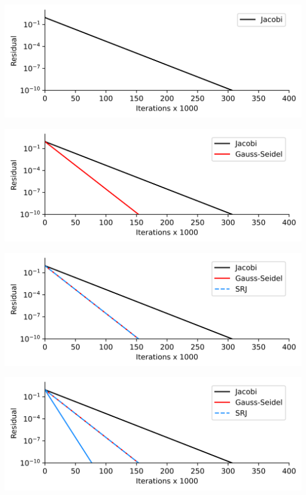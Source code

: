 \documentclass[aspectratio=169]{beamer}
\begin{document}
{
  \begin{frame}
    \begin{overprint}
      \includegraphics[width=\textwidth]{comparaisons_1D_jacobi}

      \includegraphics[width=\textwidth]{comparaisons_1D_gs}

      \includegraphics[width=\textwidth]{comparaisons_1D_srj_k=2}

      \includegraphics[width=\textwidth]{comparaisons_1D_srj_k=4}


\end{overprint}
\end{frame}}
\end{document}
